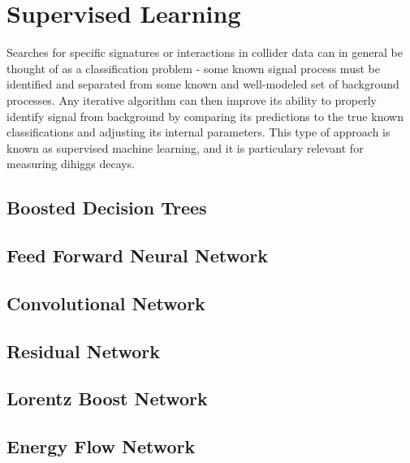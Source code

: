 \section{Supervised Learning}
\label{sec:supervised}
Searches for specific signatures or interactions in collider data can in general be thought of as a classification problem - some known signal process must be identified and separated from some known and well-modeled set of background processes. Any iterative algorithm can then improve its ability to properly identify signal from background by comparing its predictions to the true known classifications and adjusting its internal parameters. This type of approach is known as supervised machine learning, and it is particulary relevant for measuring dihiggs decays. 

\subsection{Boosted Decision Trees}


\subsection{Feed Forward Neural Network}


\subsection{Convolutional Network}


\subsection{Residual Network}

\subsection{Lorentz Boost Network}


\subsection{Energy Flow Network}

